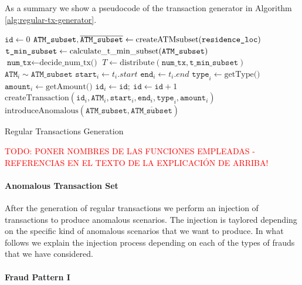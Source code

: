\documentclass{article}
\begin{document}
As a summary we show a pseudocode of the transaction generator in Algorithm \ref{alg:regular-tx-generator}.

\begin{algorithm}[H]
  \small
  \begin{algorithmic}[1]
  \STATE $\texttt{id} \gets 0$
    \STATE $\texttt{ATM\_subset}, \overline{\texttt{ATM\_subset}} \gets \text{createATMsubset(\texttt{residence\_loc})}$
    \STATE $\texttt{t\_min\_subset} \gets \text{calculate\_t\_min\_subset(\texttt{ATM\_subset})}$
    \STATE $\texttt{num\_tx} \gets \text{decide\_num\_tx()}$
    \STATE $T \gets \text{distribute}(\texttt{num\_tx}, \texttt{t\_min\_subset})$
        \STATE $\texttt{ATM}_{i} \sim \texttt{ATM\_subset}$
        \STATE $\texttt{start}_{i} \gets t_i.start$
        \STATE $\texttt{end}_{i} \gets t_i.end$
        \STATE $\texttt{type}_{i} \gets \text{getType()}$
        \STATE $\texttt{amount}_{i} \gets \text{getAmount()}$
        \STATE $\texttt{id}_{i} \gets \texttt{id}; \ \texttt{id} \gets \texttt{id} + 1$
        \STATE $\text{createTransaction}(\texttt{id}_{i}, \texttt{ATM}_i, \texttt{start}_{i},\texttt{end}_{i}, \texttt{type}_{i}, \texttt{amount}_i)$
    \ENDFOR
    \STATE $\text{introduceAnomalous}(\texttt{ATM\_subset}, \overline{\texttt{ATM\_subset}})$
  \ENDFOR
  \end{algorithmic}
  \caption{Regular Transactions Generation}
  \label{alg:regular-tx-generator}
\end{algorithm}

\textcolor{red}{TODO: PONER NOMBRES DE LAS FUNCIONES EMPLEADAS - REFERENCIAS EN EL TEXTO DE LA EXPLICACIÓN DE ARRIBA!}

\paragraph{Anomalous Transaction Set\\}

After the generation of regular transactions we perform an injection of transactions to produce anomalous scenarios. The injection is taylored depending on the specific kind of 
anomalous scenarios that we want to produce. In what follows we explain the injection process depending on each of the types of frauds that we have considered.

\paragraph{Fraud Pattern I}
\end{document}
